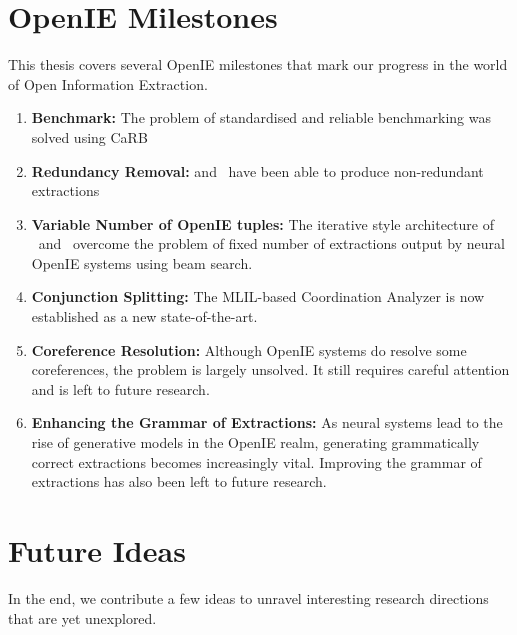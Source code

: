 \section{OpenIE Milestones}

    This thesis covers several OpenIE milestones that mark our progress in the world of Open Information Extraction.

    \begin{enumerate}
        \item \textbf{Benchmark:} The problem of standardised and reliable benchmarking was solved using CaRB \citep{bhardwaj&al19}
        \item \textbf{Redundancy Removal:} \shortname \citep{kolluru&al20} and \mlilshortname\ have been able to produce non-redundant extractions
        \item \textbf{Variable Number of OpenIE tuples:} The iterative style architecture of \shortname\ and \mlilshortname\ overcome the problem of fixed number of extractions output by neural OpenIE systems using beam search.
        \item \textbf{Conjunction Splitting:} The MLIL-based Coordination Analyzer is now established as a new state-of-the-art.
        \item \textbf{Coreference Resolution:} Although OpenIE systems do resolve some coreferences, the problem is largely unsolved. It still requires careful attention and is left to future research.
        \item \textbf{Enhancing the Grammar of Extractions:} As neural systems lead to the rise of generative models in the OpenIE realm, generating grammatically correct extractions becomes increasingly vital. Improving the grammar of extractions has also been left to future research.
    \end{enumerate}


\section{Future Ideas}

    In the end, we contribute a few ideas to unravel interesting research directions that are yet unexplored.


